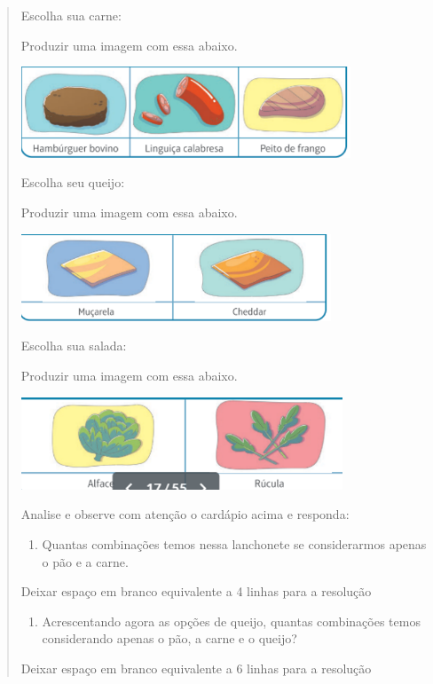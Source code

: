 \begin{enumerate}
\begin{escolha}
\begin{enumerate}
\begin{itemize}
\begin{itemize}
\begin{escolha}
\begin{quote}
\begin{escolha}
{Escolha sua carne:

Produzir uma imagem com essa abaixo.

\includegraphics[width=3.86538in,height=1.06976in]{media/image135.png}

Escolha seu queijo:

Produzir uma imagem com essa abaixo.

\includegraphics[width=3.64103in,height=1.02299in]{media/image136.png}

Escolha sua salada:

Produzir uma imagem com essa abaixo.

\includegraphics[width=3.76923in,height=1.08430in]{media/image137.png}

Analise e observe com atenção o cardápio acima e responda:

\begin{enumerate}
\def\labelenumi{\alph{enumi})}
\item
  Quantas combinações temos nessa lanchonete se considerarmos apenas o
  pão e a carne.
\end{enumerate}

Deixar espaço em branco equivalente a 4 linhas para a resolução

\begin{enumerate}
\def\labelenumi{\alph{enumi})}
\item
  Acrescentando agora as opções de queijo, quantas combinações temos
  considerando apenas o pão, a carne e o queijo?
\end{enumerate}

Deixar espaço em branco equivalente a 6 linhas para a resolução

}
\end{escolha}
\end{quote}
\end{escolha}
\end{itemize}
\end{itemize}
\end{enumerate}
\end{escolha}
\end{enumerate}
